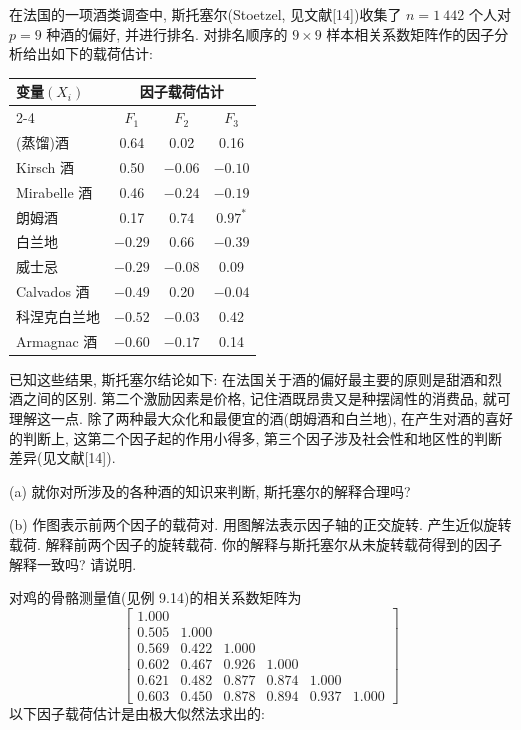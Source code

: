 
\quad 在法国的一项酒类调查中, 斯托塞尔(Stoetzel, 见文献[14])收集了 $n=1\ 442$ 个人对 $p=9$ 种酒的偏好, 并进行排名. 对排名顺序的 $9\times9$ 样本相关系数矩阵作的因子分析给出如下的载荷估计:

\begin{mvtable}
\small
\begin{tabular}{lccc}
\toprule
变量$(X_i)$ & \multicolumn{3}{c}{因子载荷估计}\\
\cmidrule(lr){2-4}
& $F_1$ & $F_2$ & $F_3$\\
\midrule
(蒸馏)酒 & 0.64 & 0.02 & 0.16\\
Kirsch 酒 & 0.50 & $-0.06$ & $-0.10$\\
Mirabelle 酒 & 0.46 & $-0.24$ & $-0.19$\\
朗姆酒 & 0.17 & 0.74 & $0.97^{*}$\\
白兰地 & $-0.29$ & 0.66 & $-0.39$\\
威士忌 & $-0.29$ & $-0.08$ & 0.09\\
Calvados 酒 & $-0.49$ & 0.20 & $-0.04$\\
科涅克白兰地 & $-0.52$ & $-0.03$ & 0.42\\
Armagnac 酒 & $-0.60$ & $-0.17$ & 0.14\\
\bottomrule
\end{tabular}
\end{mvtable}


已知这些结果, 斯托塞尔结论如下: 在法国关于酒的偏好最主要的原则是甜酒和烈酒之间的区别. 第二个激励因素是价格, 记住酒既昂贵又是种摆阔性的消费品, 就可理解这一点. 除了两种最大众化和最便宜的酒(朗姆酒和白兰地), 在产生对酒的喜好的判断上, 这第二个因子起的作用小得多, 第三个因子涉及社会性和地区性的判断差异(见文献[14]).

(a) 就你对所涉及的各种酒的知识来判断, 斯托塞尔的解释合理吗?

(b) 作图表示前两个因子的载荷对. 用图解法表示因子轴的正交旋转. 产生近似旋转载荷. 解释前两个因子的旋转载荷. 你的解释与斯托塞尔从未旋转载荷得到的因子解释一致吗? 请说明.

\quad 对鸡的骨骼测量值(见例 9.14)的相关系数矩阵为
\[
\left[\begin{array}{rrrrrr}
1.000& & & & & \\
0.505&1.000& & & & \\
0.569&0.422&1.000& & & \\
0.602&0.467&0.926&1.000& & \\
0.621&0.482&0.877&0.874&1.000& \\
0.603&0.450&0.878&0.894&0.937&1.000
\end{array}\right]
\]
以下因子载荷估计是由极大似然法求出的:

